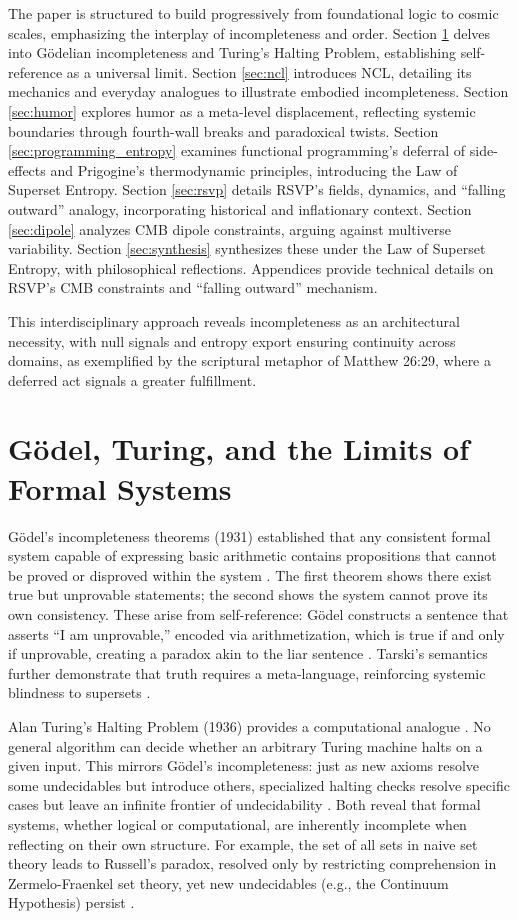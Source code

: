 \documentclass{article}
\begin{document}
The paper is structured to build progressively from foundational logic to cosmic scales, emphasizing the interplay of incompleteness and order. Section \ref{sec:godel} delves into G\"{o}delian incompleteness and Turing's Halting Problem, establishing self-reference as a universal limit. Section \ref{sec:ncl} introduces NCL, detailing its mechanics and everyday analogues to illustrate embodied incompleteness. Section \ref{sec:humor} explores humor as a meta-level displacement, reflecting systemic boundaries through fourth-wall breaks and paradoxical twists. Section \ref{sec:programming_entropy} examines functional programming's deferral of side-effects and Prigogine's thermodynamic principles, introducing the Law of Superset Entropy. Section \ref{sec:rsvp} details RSVP's fields, dynamics, and ``falling outward'' analogy, incorporating historical and inflationary context. Section \ref{sec:dipole} analyzes CMB dipole constraints, arguing against multiverse variability. Section \ref{sec:synthesis} synthesizes these under the Law of Superset Entropy, with philosophical reflections. Appendices provide technical details on RSVP's CMB constraints and ``falling outward'' mechanism.

This interdisciplinary approach reveals incompleteness as an architectural necessity, with null signals and entropy export ensuring continuity across domains, as exemplified by the scriptural metaphor of Matthew 26:29, where a deferred act signals a greater fulfillment.

\section{G\"{o}del, Turing, and the Limits of Formal Systems}
\label{sec:godel}
G\"{o}del's incompleteness theorems (1931) established that any consistent formal system capable of expressing basic arithmetic contains propositions that cannot be proved or disproved within the system \citep{godel1931}. The first theorem shows there exist true but unprovable statements; the second shows the system cannot prove its own consistency. These arise from self-reference: G\"{o}del constructs a sentence that asserts ``I am unprovable,'' encoded via arithmetization, which is true if and only if unprovable, creating a paradox akin to the liar sentence \citep{nagel1958}. Tarski's semantics further demonstrate that truth requires a meta-language, reinforcing systemic blindness to supersets \citep{tarski1956}.

Alan Turing's Halting Problem (1936) provides a computational analogue \citep{turing1936}. No general algorithm can decide whether an arbitrary Turing machine halts on a given input. This mirrors G\"{o}del's incompleteness: just as new axioms resolve some undecidables but introduce others, specialized halting checks resolve specific cases but leave an infinite frontier of undecidability \citep{davis1958, sipser2012}. Both reveal that formal systems, whether logical or computational, are inherently incomplete when reflecting on their own structure. For example, the set of all sets in naive set theory leads to Russell's paradox, resolved only by restricting comprehension in Zermelo-Fraenkel set theory, yet new undecidables (e.g., the Continuum Hypothesis) persist \citep{godel1931}.
\end{document}
